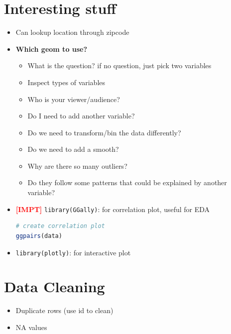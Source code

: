 \documentclass{article}
\newcommand{\impt}[0]{\textcolor{red}{\textbf{[IMPT] }}}
\begin{document}
\begin{multicols}{2}
\section{Interesting stuff}
\begin{itemize}
	\item Can lookup location through zipcode
	\item \textbf{Which geom to use?}
	\begin{itemize}
		\item What is the question? if no question, just pick two variables
		\item Inspect types of variables
		\item Who is your viewer/audience?
		\item Do I need to add another variable?
		\item Do we need to transform/bin the data differently?
		\item Do we need to add a smooth?
		\item Why are there so many outliers?
		\item Do they follow some patterns that could be explained by another variable?
	\end{itemize}
    \item \impt \texttt{library(GGally)}: for correlation plot, useful for EDA
    \begin{lstlisting}[language=R]
# create correlation plot
ggpairs(data)
\end{lstlisting}
    \item \texttt{library(plotly)}: for interactive plot
\end{itemize}

\section{Data Cleaning}
\begin{itemize}
	\item Duplicate rows (use id to clean)
	\item NA values
\end{itemize}
\end{multicols}
\end{document}
